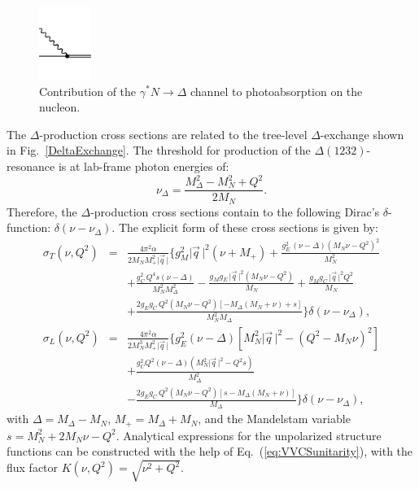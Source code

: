 \documentclass[12pt,preprint,tightenlines,
showpacs,preprintnumbers,amsmath,amssymb,
a4paper,nofootinbib]{revtex4-2}
\def\beq{\begin{equation}}
\def\eeq{\end{equation}}
\def\bea{\begin{eqnarray}}
\def\eea{\end{eqnarray}}
\def\Eqref#1{Eq.~(\ref{eq:#1})}
\def\al{\alpha}
\def\ga{\gamma} \def\Ga{{\it\Gamma}}
\def\de{\delta} \def\De{\Delta}
\def\si{\sigma} \def\Si{{\it\Sigma}}
\def\nn{\nonumber}
\begin{document}
\begin{figure}[tbh]
    \centering 
  \includegraphics[width=0.15\textwidth]{DeltaExchangeCrossSection.pdf}
\caption{\small{Contribution of the $\ga^\ast N \to  \Delta$ channel to photoabsorption on the nucleon.\label{fig:CrossSectionDeltaProd}}}
\end{figure}


The $\Delta$-production cross sections are related to the tree-level $\Delta$-exchange shown in Fig.~\ref{DeltaExchange}. The threshold for production of the $\Delta(1232)$-resonance is at lab-frame photon energies of:
\beq
\nu_\Delta=\frac{M_\Delta^2-M_N^2+Q^2}{2M_N}.
\eeq
Therefore, the $\Delta$-production cross sections contain to the following Dirac's $\de$-function: $\delta(\nu-\nu_\Delta)$. The
explicit form of these cross sections is given by:
\begin{subequations}
\bea
\si_T(\nu,Q^2)&=&\frac{4\pi^2 \al}{2M_NM_+^2\vert \vec{q}\,\vert}\Bigg\{g_M^2 \vert \vec{q}\, \vert ^2 (\nu +M_+)+\frac{g_E^2\, (\nu -\varDelta ) \left(M_N\nu -Q^2\right)^2}{M_N^2}\\
&&+\frac{g_C^2 \,Q^4 s (\nu -\varDelta )}{M_N^2 M_\Delta^2}-\frac{g_M g_E\, \vert \vec{q}\, \vert ^2 \left(M_N\nu -Q^2\right)}{M_N}+\frac{g_M g_C\, \vert \vec{q}\, \vert ^2 Q^2}{M_N}\nn\\
&&+\frac{2 g_E g_C \,Q^2 \left(M_N\nu -Q^2\right) [-M_\Delta(M_N+\nu)+s]}{M_N^2 M_\Delta}\Bigg\}\delta\!\left(\nu-\nu_\Delta\right),\nn\\
\si_L(\nu,Q^2)&=&\frac{4\pi^2 \al}{2M_N^3M_+^2\vert \vec{q}\,\vert}\Bigg\{g_E^2(\nu-\varDelta)\left[M_N^2 \vert \vec{q}\, \vert^2-(Q^2-M_N\nu)^2\right]\\
&&+\frac{g_C^2 Q^2(\nu-\varDelta)(M_N^2 \vert \vec{q}\, \vert^2-Q^2 s)}{M_\Delta^2}\nn\\
&&-\frac{2 g_E g_C \,Q^2 \left(M_N\nu -Q^2\right) [s-M_\Delta(M_N+\nu)]}{ M_\Delta}\Bigg\}\delta\!\left(\nu-\nu_\Delta\right),\nn
\eea
\end{subequations}
with $\varDelta=M_\Delta - M_N$, $M_+=M_\Delta + M_N$, and the Mandelstam variable $s=M_N^2+2M_N \nu-Q^2$.
Analytical expressions for the unpolarized structure functions can be constructed with the help of \Eqref{VVCSunitarity}, with the flux factor $K(\nu,Q^2)=\sqrt{\nu^2+Q^2}$.
\end{document}
